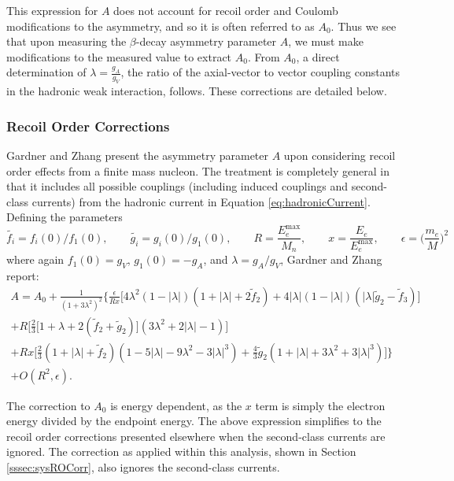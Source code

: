 This expression for $A$ does not account for recoil order and Coulomb modifications to the asymmetry, and so it is
often referred to as $A_0$. Thus we see that upon measuring the $\beta$-decay
asymmetry parameter $A$, we must make modifications to the measured value to extract
$A_0$. From $A_0$, a direct determination of $\lambda = \frac{g_A}{g_V}$, the ratio of the axial-vector to vector
coupling constants in the hadronic weak interaction, follows.
These corrections are detailed below.

\subsubsection{Recoil Order Corrections}  \label{sssec:ROCorr}

Gardner and Zhang \cite{gardner2001} present the asymmetry parameter $A$ upon considering recoil order effects
from a finite mass nucleon. The treatment is completely general in that it includes all possible couplings
(including induced couplings and second-class currents) from the hadronic current in Equation
\ref{eq:hadronicCurrent}. Defining the parameters
%
\begin{equation*}
  \tilde{f_i}=f_i(0)/f_1(0),\qquad  \tilde{g_i}=g_i(0)/g_1(0), \qquad
  R=\frac{E^{\mathrm{max}}_e}{M_n}, \qquad x = \frac{E_e}{E^{\mathrm{max}}_e}, \qquad \epsilon=\Big(\frac{m_e}{M}\Big)^2
\end{equation*}
where again $f_1(0)=g_V$, $g_1(0)=-g_A$, and $\lambda=g_A/g_V$, Gardner and Zhang report:
%
\begin{multline}
  A = A_0 + \frac{1}{(1+3\lambda^2)^2}\Bigg\{\frac{\epsilon}{Rx}\Big[4\lambda^2
      (1-|\lambda|)(1+|\lambda|+2\tilde{f}_2)+4|\lambda|(1-|\lambda|)
      (|\lambda|\tilde{g}_2-\tilde{f}_3)\Big] \\
    + R\bigg[\frac{2}{3}\big[1+\lambda+2(\tilde{f}_2+\tilde{g}_2)\big]
      (3\lambda^2+2|\lambda|-1)\bigg] \\
      +Rx\bigg[\frac{2}{3}(1+|\lambda| + \tilde{f}_2)
        (1-5|\lambda|-9\lambda^2-3|\lambda|^3)
        +\frac{4}{3}\tilde{g}_2(1+|\lambda|+3\lambda^2+3|\lambda|^3)\bigg]\Bigg\} \\
  +O(R^2,\epsilon).
\end{multline}

The correction to $A_0$ is energy dependent, as the $x$ term is simply the electron energy divided by
the endpoint energy. The above expression simplifies to the recoil order corrections
presented elsewhere \cite{bilenkii1960,wilkinson1982} when the second-class currents
are ignored. The correction as applied within this analysis, shown in Section \ref{sssec:sysROCorr},
also ignores the second-class currents.


